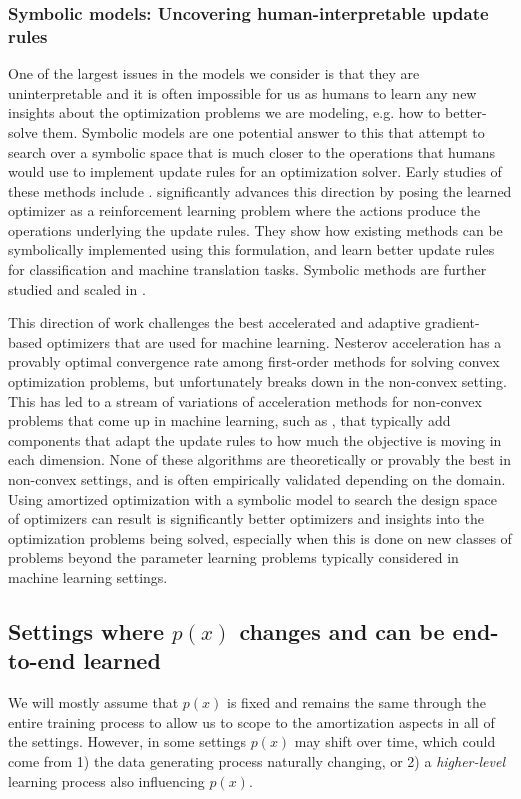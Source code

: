 \documentclass[twoside,11pt]{article}
\newcommand{\eg}{e.g.\xspace}
\begin{document}
\subsubsection{Symbolic models: Uncovering human-interpretable update rules}
One of the largest issues in the models we consider
is that they are uninterpretable and it is often impossible
for us as humans to learn any new insights about the optimization
problems we are modeling, \eg how to better-solve them.
Symbolic models are one potential answer to this that attempt
to search over a symbolic space that is much closer to the
operations that humans would use to implement update rules for
an optimization solver.
Early studies of these methods include
\citet{bengio1994use,runarsson2000evolution}.
\citet{bello2017neural} significantly advances this direction
by posing the learned optimizer as a reinforcement learning problem
where the actions produce the operations underlying the update rules.
They show how existing methods can be symbolically implemented
using this formulation, and learn better update rules for
classification and machine translation tasks.
Symbolic methods are further studied and scaled in
\citet{real2020automl,zheng2022symbolic}.

This direction of work challenges the best accelerated and adaptive
gradient-based optimizers that are used for machine learning.
Nesterov acceleration \citep{nesterov1983method} has a provably
optimal convergence rate among first-order methods for solving
convex optimization problems, but unfortunately breaks down
in the non-convex setting.
This has led to a stream of variations of acceleration methods
for non-convex problems that come up in machine learning,
such as \citet{duchi2011adaptive,zeiler2012adadelta,kingma2014adam},
that typically add components that adapt the update rules to
how much the objective is moving in each dimension.
None of these algorithms are theoretically or provably the
best in non-convex settings, and is often empirically validated
depending on the domain.
Using amortized optimization with a symbolic model to search
the design space of optimizers can result is significantly
better optimizers and insights into the optimization problems
being solved, especially when this is done on new classes
of problems beyond the parameter learning problems typically
considered in machine learning settings.


\subsection{Settings where $p(x)$ changes and can be end-to-end learned}
We will mostly assume that $p(x)$ is fixed and remains
the same through the entire training process to allow us
to scope to the amortization aspects in all of the settings.
However, in some settings $p(x)$ may shift over time, which
could come from 1) the data generating process naturally
changing, or 2) a \emph{higher-level} learning process
also influencing $p(x)$.
\end{document}
